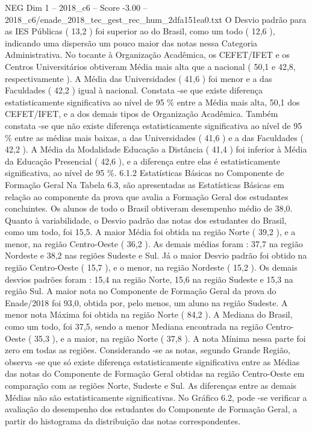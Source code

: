 \begin{textsample}{NEG Dim 1 – 2018\_c6 – Score -3.00 – 2018\_c6/enade\_2018\_tec\_gest\_rec\_hum\_2dfa151ea0.txt}
O Desvio padrão para as IES Públicas ( 13,2 ) foi superior ao do Brasil, como um todo ( 12,6 ), indicando uma dispersão um pouco maior das notas nessa Categoria Administrativa.
No tocante à Organização Acadêmica, os CEFET/IFET e os Centros Universitários obtiveram Média mais alta que a nacional ( 50,1 e 42,8, respectivamente ).
A Média das Universidades ( 41,6 ) foi menor e a das Faculdades ( 42,2 ) igual à nacional.
Constata -se que existe diferença estatisticamente significativa ao nível de 95 \% entre a Média mais alta, 50,1 dos CEFET/IFET, e a dos demais tipos de Organização Acadêmica.
Também constata -se que não existe diferença estatisticamente significativa ao nível de 95 \% entre as médias mais baixas, a das Universidades ( 41,6 ) e a das Faculdades ( 42,2 ).
A Média da Modalidade Educação a Distância ( 41,4 ) foi inferior à Média da Educação Presencial ( 42,6 ), e a diferença entre elas é estatisticamente significativa, ao nível de 95 \%. 6.1.2 Estatísticas Básicas no Componente de Formação Geral Na Tabela 6.3, são apresentadas as Estatísticas Básicas em relação ao componente da prova que avalia a Formação Geral dos estudantes concluintes.
Os alunos de todo o Brasil obtiveram desempenho médio de 38,0.
Quanto à variabilidade, o Desvio padrão das notas dos estudantes do Brasil, como um todo, foi 15,5.
A maior Média foi obtida na região Norte ( 39,2 ), e a menor, na região Centro-Oeste ( 36,2 ).
As demais médias foram : 37,7 na região Nordeste e 38,2 nas regiões Sudeste e Sul.
Já o maior Desvio padrão foi obtido na região Centro-Oeste ( 15,7 ), e o menor, na região Nordeste ( 15,2 ).
Os demais desvios padrões foram : 15,4 na região Norte, 15,6 na região Sudeste e 15,3 na região Sul.
A maior nota no Componente de Formação Geral da prova do Enade/2018 foi 93,0, obtida por, pelo menos, um aluno na região Sudeste.
A menor nota Máxima foi obtida na região Norte ( 84,2 ).
A Mediana do Brasil, como um todo, foi 37,5, sendo a menor Mediana encontrada na região Centro-Oeste ( 35,3 ), e a maior, na região Norte ( 37,8 ).
A nota Mínima nessa parte foi zero em todas as regiões.
Considerando -se as notas, segundo Grande Região, observa -se que só existe diferença estatisticamente significativa entre as Médias das notas do Componente de Formação Geral obtidas na região Centro-Oeste em comparação com as regiões Norte, Sudeste e Sul.
As diferenças entre as demais Médias não são estatisticamente significativas.
No Gráfico 6.2, pode -se verificar a avaliação do desempenho dos estudantes do Componente de Formação Geral, a partir do histograma da distribuição das notas correspondentes.

\end{textsample}
